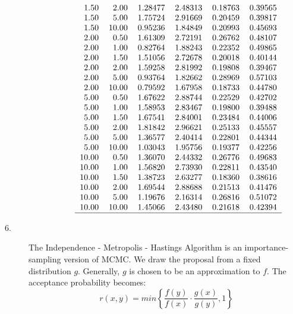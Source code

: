 \documentclass[12pt]{article}
\begin{document}
\begin{description}
\begin{description}
\[\begin{tabular}{rrrrrr}
  1.50 & 2.00 & 1.28477 & 2.48313 & 0.18763 & 0.39565 \\ 
  1.50 & 5.00 & 1.75724 & 2.91669 & 0.20459 & 0.39817 \\ 
  1.50 & 10.00 & 0.95236 & 1.84849 & 0.20993 & 0.45693 \\ 
  2.00 & 0.50 & 1.61309 & 2.72191 & 0.26762 & 0.48107 \\ 
  2.00 & 1.00 & 0.82764 & 1.88243 & 0.22352 & 0.49865 \\ 
  2.00 & 1.50 & 1.51056 & 2.72678 & 0.20018 & 0.40144 \\ 
  2.00 & 2.00 & 1.59258 & 2.81992 & 0.19808 & 0.39467 \\ 
  2.00 & 5.00 & 0.93764 & 1.82662 & 0.28969 & 0.57103 \\ 
  2.00 & 10.00 & 0.79592 & 1.67958 & 0.18733 & 0.44780 \\ 
  5.00 & 0.50 & 1.67622 & 2.88744 & 0.22529 & 0.42702 \\ 
  5.00 & 1.00 & 1.58953 & 2.83467 & 0.19800 & 0.39488 \\ 
  5.00 & 1.50 & 1.67541 & 2.84001 & 0.23484 & 0.44006 \\ 
  5.00 & 2.00 & 1.81842 & 2.96621 & 0.25133 & 0.45557 \\ 
  5.00 & 5.00 & 1.36577 & 2.40414 & 0.22801 & 0.44344 \\ 
  5.00 & 10.00 & 1.03043 & 1.95756 & 0.19377 & 0.42256 \\ 
  10.00 & 0.50 & 1.36070 & 2.44332 & 0.26776 & 0.49683 \\ 
  10.00 & 1.00 & 1.56820 & 2.73930 & 0.22811 & 0.43540 \\ 
  10.00 & 1.50 & 1.38723 & 2.63277 & 0.18360 & 0.38616 \\ 
  10.00 & 2.00 & 1.69544 & 2.88688 & 0.21513 & 0.41476 \\ 
  10.00 & 5.00 & 1.19676 & 2.16314 & 0.26816 & 0.51072 \\ 
  10.00 & 10.00 & 1.45066 & 2.43480 & 0.21618 & 0.42394 \\ 
   \hline
\end{tabular}\]
\end{description}



\item[6. ] The Independence - Metropolis - Hastings Algorithm is an importance-sampling version of MCMC. We draw the proposal from a fixed distribution $g$. Generally, $g$ is chosen to be an approximation to $f$. The acceptance probability becomes:
\[r(x, y) = min\left\{ \frac{f(y)}{f(x)} \cdot \frac{g(x)}{g(y)}, 1 \right\}\]


\end{description}
\end{document}
